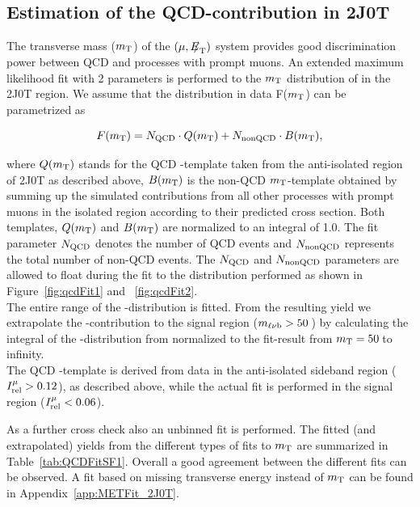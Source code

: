 \subsection{Estimation of the QCD-contribution in 2J0T}
\label{sec:qcd2J0T}
The transverse mass ($m_{\mathrm{\rm T}}$) of the $(\mu,{E\!\!\!/}_{\mathrm{T}})$ system provides good discrimination power between QCD and processes with prompt muons. An extended maximum likelihood fit with 2 parameters is performed to the $m_{\mathrm{\rm T}}$ distribution of in the 2J0T region. We assume that the \mT distribution in data F($m_{\mathrm{\rm T}}$) can be parametrized as 

\begin{center}
\begin{equation}
\label{eq:QCDFit}
F(m_{\mathrm{\rm T}}) = N_{\rm QCD} \cdot Q(m_{\mathrm{\rm T}}) + N_{\rm nonQCD} \cdot B(m_{\mathrm{\rm T}})  ,
\end{equation}
\end{center}

where $Q(m_{\mathrm{\rm T}})$ stands for the QCD \mT-template  taken from the anti-isolated region of 2J0T as described above, $B(m_{\mathrm{\rm T}})$ is the non-QCD $m_{\mathrm{\rm T}}$-template obtained by summing up 
the simulated contributions from all other processes with prompt muons in the isolated region according to their predicted cross section. Both templates, $Q(m_{\mathrm{\rm T}})$  and $B(m_{\mathrm{\rm T}})$ are normalized to an integral of 1.0. The fit parameter $N_{\rm QCD}$ denotes the number of QCD events and $N_{\rm nonQCD}$ represents the total number of non-QCD events. The $N_{\rm QCD}$ and $N_{\rm nonQCD}$ parameters are allowed to float during the fit to the \mT distribution performed as shown in Figure~\ref{fig:qcdFit1} and ~\ref{fig:qcdFit2}.\\   
 The entire range of the \mT-distribution is fitted. From the resulting \QCD yield we extrapolate the \QCD-contribution to the signal region ($m_{\ell\nu \mathrm{b}} > 50\,$\GeV) by calculating the integral of the \mT-distribution from \QCD normalized to the fit-result from $m_{\mathrm{\rm T}} = 50\,$\GeV to infinity.\\
 The QCD \mT-template is derived from data in the anti-isolated sideband region ($I_{\rm rel}^{\mu} > 0.12$), as described above, while the actual fit is performed in the signal region ($I_{\rm rel}^{\mu} < 0.06$). 

As a further cross check also an unbinned fit is performed. The fitted (and extrapolated) yields from the different types of fits to $m_{\mathrm{\rm T}}$ are summarized in Table~\ref{tab:QCDFitSF1}. Overall a good agreement between the different fits can be observed. A fit based on missing transverse energy instead of $m_{\mathrm{\rm T}}$ can be found in Appendix~\ref{app:METFit_2J0T}.


